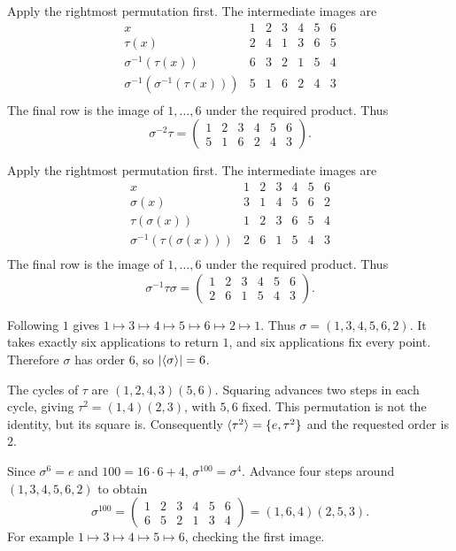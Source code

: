 \idea Apply the rightmost permutation first. The intermediate images are
\[\begin{array}{c|rrrrrr}x & 1&2&3&4&5&6\\\hline
\tau(x) & 2 & 4 & 1 & 3 & 6 & 5\\
\sigma^{-1}(\tau(x)) & 6 & 3 & 2 & 1 & 5 & 4\\
\sigma^{-1}(\sigma^{-1}(\tau(x))) & 5 & 1 & 6 & 2 & 4 & 3\\\end{array}\]
The final row is the image of $1,\ldots,6$ under the required product. Thus\[\sigma^{-2}\tau=\begin{pmatrix}1 & 2 & 3 & 4 & 5 & 6\\5 & 1 & 6 & 2 & 4 & 3\end{pmatrix}.\]

\idea Apply the rightmost permutation first. The intermediate images are
\[\begin{array}{c|rrrrrr}x & 1&2&3&4&5&6\\\hline
\sigma(x) & 3 & 1 & 4 & 5 & 6 & 2\\
\tau(\sigma(x)) & 1 & 2 & 3 & 6 & 5 & 4\\
\sigma^{-1}(\tau(\sigma(x))) & 2 & 6 & 1 & 5 & 4 & 3\\\end{array}\]
The final row is the image of $1,\ldots,6$ under the required product. Thus\[\sigma^{-1}\tau\sigma=\begin{pmatrix}1 & 2 & 3 & 4 & 5 & 6\\2 & 6 & 1 & 5 & 4 & 3\end{pmatrix}.\]

Following $1$ gives $1\mapsto3\mapsto4\mapsto5\mapsto6\mapsto2\mapsto1$. Thus $\sigma=(1,3,4,5,6,2)$. It takes exactly six applications to return $1$, and six applications fix every point. Therefore $\sigma$ has order $6$, so $|\langle \sigma\rangle|=6$.

The cycles of $\tau$ are $(1,2,4,3)(5,6)$. Squaring advances two steps in each cycle, giving $\tau^2=(1,4)(2,3)$, with $5,6$ fixed. This permutation is not the identity, but its square is. Consequently $\langle \tau^2\rangle=\{e,\tau^2\}$ and the requested order is $2$.

Since $\sigma^6=e$ and $100=16\cdot6+4$, $\sigma^{100}=\sigma^4$. Advance four steps around $(1,3,4,5,6,2)$ to obtain
\[\sigma^{100}=\begin{pmatrix}1&2&3&4&5&6\\6&5&2&1&3&4\end{pmatrix}=(1,6,4)(2,5,3).\]
For example $1\mapsto3\mapsto4\mapsto5\mapsto6$, checking the first image.

